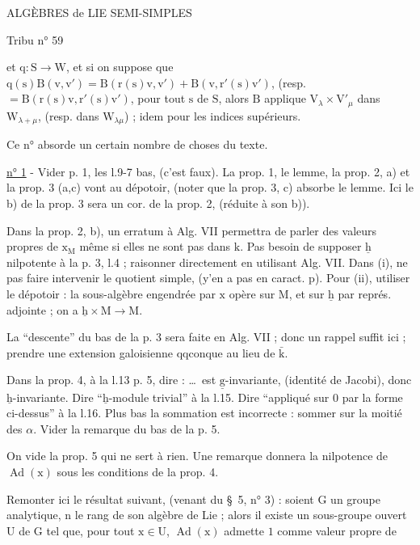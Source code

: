 ALGÈBRES de LIE SEMI-SIMPLES 

Tribu n° 59

et $\mathrm{q}:\mathrm{S}\longrightarrow\mathrm{W}$, et si on suppose que $\mathrm{q}(\mathrm{s})\mathrm{B}(\mathrm{v},\mathrm{v}')=\mathrm{B}(\mathrm{r}(\mathrm{s})\mathrm{v},\mathrm{v}')+\mathrm{B}(\mathrm{v},\mathrm{r}'(\mathrm{s})\mathrm{v}')$, (resp. $=\mathrm{B}(\mathrm{r}(\mathrm{s})\mathrm{v},\mathrm{r}'(\mathrm{s})\mathrm{v}')$, pour tout $\mathrm{s}$ de $\mathrm{S}$, alors $\mathrm{B}$ applique $\mathrm{V}_{\lambda}\times\mathrm{V}'_{\mu}$ dans $\mathrm{W}_{\lambda+\mu}$, (resp. dans $\mathrm{W}_{\lambda\mu}$) ; idem pour les indices supérieurs.

Ce n° absorde un certain nombre de choses du texte.

\uline{n° 1} - Vider p. 1, les l.9-7 bas, (c'est faux). La prop. 1, le lemme, la prop. 2, a) et la prop. 3 (a,c) vont au dépotoir, (noter que la prop. 3, c) absorbe le lemme. Ici le b) de la prop. 3 sera un cor. de la prop. 2, (réduite à son b)).

Dans la prop. 2, b), un erratum à Alg. VII permettra de parler des valeurs propres de $\mathrm{x}_{\mathrm M}$ même si elles ne sont pas dans $\mathrm{k}$. Pas besoin de supposer $\underline{\mathrm h}$ nilpotente à la p. 3, l.4 ; raisonner directement en utilisant Alg. VII. Dans (i), ne pas faire intervenir le quotient simple, (y'en a pas en caract. $\mathrm{p}$). Pour (ii), utiliser le dépotoir : la sous-algèbre engendrée par $\mathrm{x}$ opère sur $\mathrm{M}$, et sur $\underline{\mathrm h}$ par représ. adjointe ; on a $\underline{\mathrm h}\times\mathrm{M}\longrightarrow\mathrm{M}$.

La ``descente'' du bas de la p. 3 sera faite en Alg. VII ; donc un rappel suffit ici ; prendre une extension galoisienne qqconque au lieu de $\bar{\mathrm{k}}$.

Dans la prop. 4, à la l.13 p. 5, dire : \ldots\ est $\underline{\mathrm{g}}$-invariante, (identité de Jacobi), donc $\underline{\mathrm{h}}$-invariante. Dire ``$\underline{\mathrm{h}}$-module trivial'' à la l.15. Dire ``appliqué sur $0$ par la forme ci-dessus'' à la l.16. Plus bas la sommation est incorrecte : sommer sur la moitié des $\alpha$. Vider la remarque du bas de la p. 5.

On vide la prop. 5 qui ne sert à rien. Une remarque donnera la nilpotence de $\operatorname{Ad}(\mathrm{x})$ sous les conditions de la prop. 4.

Remonter ici le résultat suivant, (venant du \S\ 5, n° 3) : soient $\mathrm{G}$ un groupe analytique, $\mathrm{n}$ le rang de son algèbre de Lie ; alors il existe un sous-groupe ouvert $\mathrm{U}$ de $\mathrm{G}$ tel que, pour tout $\mathrm{x}\in\mathrm{U}$, $\operatorname{Ad}(\mathrm{x})$ admette $1$ comme valeur propre de

